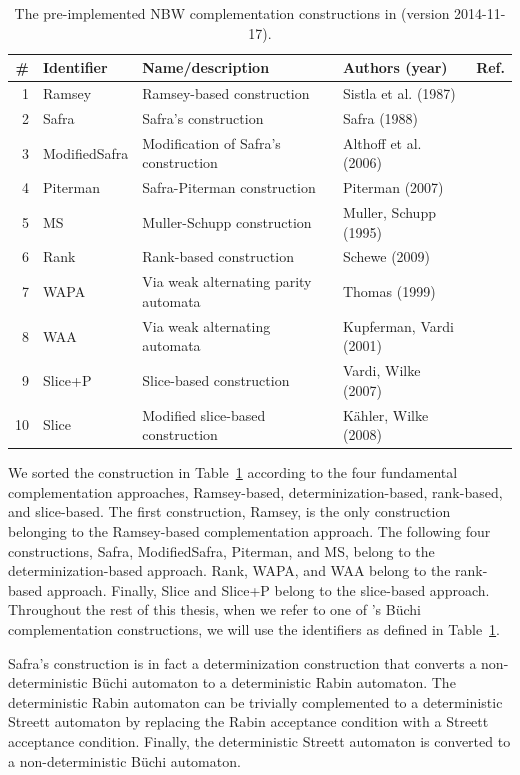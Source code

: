 \begin{table}[htb!]
\centering
\begin{tabular}{rlllr}
\hline
\# & Identifier & Name/description & Authors (year) & Ref. \\
\hline
1 & Ramsey & Ramsey-based construction & Sistla et al. (1987) & \cite{PrasadSistla1987217} \\
2 & Safra & Safra's construction & Safra (1988) & \cite{1988_safra_1} \\
3 & ModifiedSafra & Modification of Safra's construction & Althoff et al. (2006) & \cite{2006_althoff} \\
4 & Piterman & Safra-Piterman construction & Piterman (2007) & \cite{2007_piterman} \\
5 & MS & Muller-Schupp construction & Muller, Schupp (1995) & \cite{Muller199569} \\
6 & Rank & Rank-based construction & Schewe (2009) & \cite{schewe2009buchi} \\
7 & WAPA & Via weak alternating parity automata & Thomas (1999) & \cite{1999_thomas} \\
8 & WAA & Via weak alternating automata & Kupferman, Vardi (2001) & \cite{Kupferman:2001} \\
9 & Slice+P & Slice-based construction & Vardi, Wilke (2007) & \cite{vardi2007automata} \\
10 & Slice & Modified slice-based construction & Kähler, Wilke (2008) & \cite{2008_kaehler} \\
\hline
\end{tabular}
\caption{The pre-implemented NBW complementation constructions in \goal{} (version 2014-11-17).}
\label{goal_constructions}
\end{table}

We sorted the construction in Table~\ref{goal_constructions} according to the four fundamental complementation approaches, Ramsey-based, determinization-based, rank-based, and slice-based. The first construction, Ramsey, is the only construction belonging to the Ramsey-based complementation approach. The following four constructions, Safra, ModifiedSafra, Piterman, and MS, belong to the determinization-based approach. Rank, WAPA, and WAA belong to the rank-based approach. Finally, Slice and Slice+P belong to the slice-based approach. Throughout the rest of this thesis, when we refer to one of \goal's Büchi complementation constructions, we will use the identifiers as defined in Table~\ref{goal_constructions}.

Safra's construction is in fact a determinization construction that converts a non-deterministic Büchi automaton to a deterministic Rabin automaton. The deterministic Rabin automaton can be trivially complemented to a deterministic Streett automaton by replacing the Rabin acceptance condition with a Streett acceptance condition. Finally, the deterministic Streett automaton is converted to a non-deterministic Büchi automaton.

